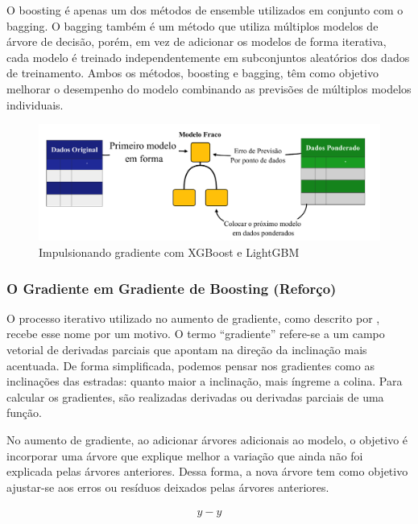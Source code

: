 O boosting é apenas um dos métodos de ensemble utilizados em conjunto com o bagging. O bagging também é um método que utiliza múltiplos modelos de árvore de decisão, porém, em vez de adicionar os modelos de forma iterativa, cada modelo é treinado independentemente em subconjuntos aleatórios dos dados de treinamento. Ambos os métodos, boosting e bagging, têm como objetivo melhorar o desempenho do modelo combinando as previsões de múltiplos modelos individuais.


\begin{figure}[H]
	\centering
	\caption{Impulsionando gradiente com XGBoost e LightGBM}
	\label{fig:xgboos}
	\includegraphics[width=1\linewidth]{Modelos/Figuras/xgboos}
	
\end{figure}



\subsubsection{O Gradiente em Gradiente de Boosting (Refor\c co)} \label{subsubsec:boosting}

O processo iterativo utilizado no aumento de gradiente, como descrito por , recebe esse nome por um motivo. O termo ``gradiente'' refere-se a um campo vetorial de derivadas parciais que apontam na direção da inclinação mais acentuada. De forma simplificada, podemos pensar nos gradientes como as inclinações das estradas: quanto maior a inclinação, mais íngreme a colina. Para calcular os gradientes, são realizadas derivadas ou derivadas parciais de uma função.

No aumento de gradiente, ao adicionar árvores adicionais ao modelo, o objetivo é incorporar uma árvore que explique melhor a variação que ainda não foi explicada pelas árvores anteriores. Dessa forma, a nova árvore tem como objetivo ajustar-se aos erros ou resíduos deixados pelas árvores anteriores.

\begin{equation}
	y-\hat{y} \label{eq:xb}
\end{equation}

